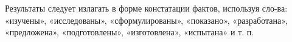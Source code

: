 
Результаты следует излагать в форме констатации фактов, используя сло-ва: «изучены», «исследованы», «сформулированы», «показано», «разработана», «предложена», «подготовлены», «изготовлена», «испытана» и т. п.
